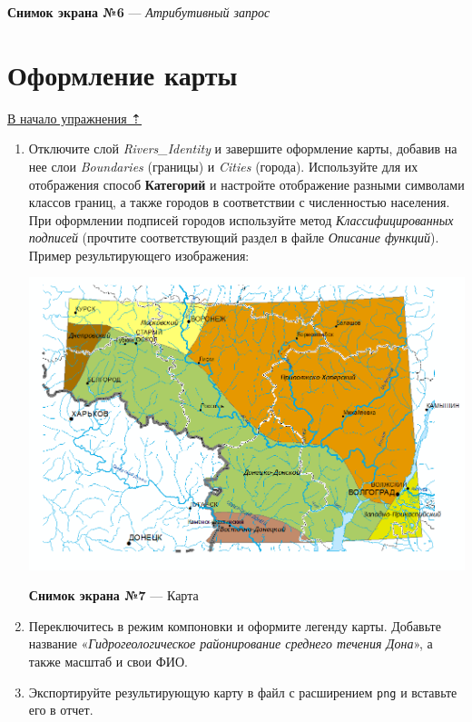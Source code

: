 \documentclass[]{book}
\theoremstyle{definition}
\theoremstyle{definition}
\theoremstyle{definition}
\theoremstyle{remark}
\begin{document}
\textbf{Снимок экрана №6} --- \emph{Атрибутивный запрос}

\hypertarget{map-ref-hydrogeologic-design}{%
\section{Оформление карты}\label{map-ref-hydrogeologic-design}}

\protect\hyperlink{map-ref-hydrogeologic}{В начало упражнения ⇡}

\begin{enumerate}
\def\labelenumi{\arabic{enumi}.}
\item
  Отключите слой \emph{Rivers\_Identity} и завершите оформление карты,
  добавив на нее слои \emph{Boundaries} (границы) и \emph{Cities}
  (города). Используйте для их отображения способ \textbf{Категорий} и
  настройте отображение разными символами классов границ, а также
  городов в соответствии с численностью населения. При оформлении
  подписей городов используйте метод \emph{Классифицированных подписей}
  (прочтите соответствующий раздел в файле \emph{Описание функций}).
  Пример результирующего изображения:

  \includegraphics{images/Ex05/image24.png}

  \textbf{Снимок экрана №7} --- Карта
\item
  Переключитесь в режим компоновки и оформите легенду карты. Добавьте
  название «\emph{Гидрогеологическое районирование среднего течения
  Дона}», а также масштаб и свои ФИО.
\item
  Экспортируйте результирующую карту в файл с расширением \texttt{png} и
  вставьте его в отчет.
\end{enumerate}
\end{document}
